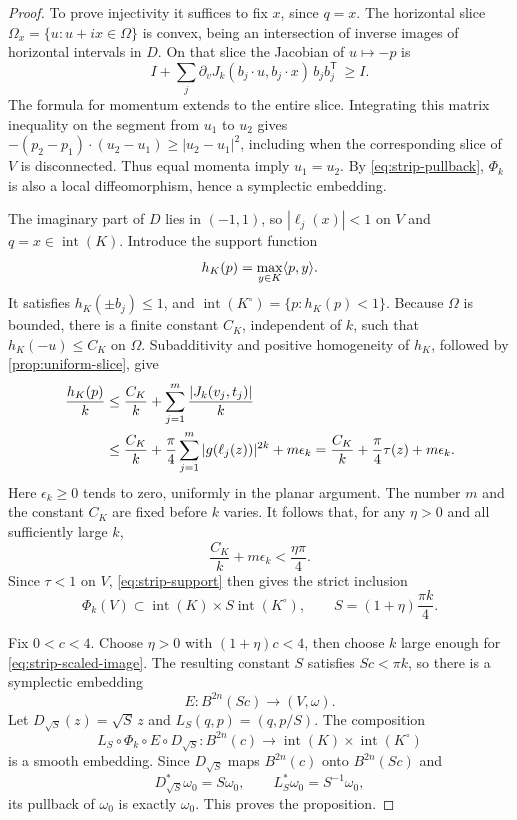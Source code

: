 \begin{proof}
To prove injectivity it suffices to fix $x$, since $q=x$. The horizontal slice $\Omega_x=\{u:u+ix\in\Omega\}$ is convex, being an intersection of inverse images of horizontal intervals in $D$. On that slice the Jacobian of $u\mapsto-p$ is
\[
 I+\sum_j\partial_vJ_k(b_j\cdot u,b_j\cdot x)\,b_j b_j^{\mathsf T}\ \ge I.
\]
The formula for momentum extends to the entire slice. Integrating this matrix inequality on the segment from $u_1$ to $u_2$ gives $-(p_2-p_1)\cdot(u_2-u_1)\ge|u_2-u_1|^2$, including when the corresponding slice of $V$ is disconnected. Thus equal momenta imply $u_1=u_2$. By \eqref{eq:strip-pullback}, $\Phi_k$ is also a local diffeomorphism, hence a symplectic embedding.

The imaginary part of $D$ lies in $(-1,1)$, so $|\ell_j(x)|<1$ on $V$ and $q=x\in\operatorname{int}(K)$. Introduce the support function
\[
 h_K(p)=\max_{y\in K}\langle p,y\rangle.
\]
It satisfies $h_K(\pm b_j)\le1$, and $\operatorname{int}(K^\circ)=\{p:h_K(p)<1\}$. Because $\Omega$ is bounded, there is a finite constant $C_K$, independent of $k$, such that $h_K(-u)\le C_K$ on $\Omega$. Subadditivity and positive homogeneity of $h_K$, followed by \cref{prop:uniform-slice}, give
\begin{align}
 \frac{h_K(p)}{k}
 &\le \frac{C_K}{k}
       +\sum_{j=1}^m\frac{|J_k(v_j,t_j)|}{k}\notag\\
 &\le \frac{C_K}{k}
       +\frac{\pi}{4}\sum_{j=1}^m|g(\ell_j(z))|^{2k}
       +m\epsilon_k
  =\frac{C_K}{k}+\frac{\pi}{4}\tau(z)+m\epsilon_k.
 \label{eq:strip-support}
\end{align}
Here $\epsilon_k\ge0$ tends to zero, uniformly in the planar argument. The number $m$ and the constant $C_K$ are fixed before $k$ varies. It follows that, for any $\eta>0$ and all sufficiently large $k$,
\[
 \frac{C_K}{k}+m\epsilon_k<\frac{\eta\pi}{4}.
\]
Since $\tau<1$ on $V$, \eqref{eq:strip-support} then gives the strict inclusion
\begin{equation}\label{eq:strip-scaled-image}
 \Phi_k(V)\subset
 \operatorname{int}(K)\times S\operatorname{int}(K^\circ),
 \qquad S=(1+\eta)\frac{\pi k}{4}.
\end{equation}

Fix $0<c<4$. Choose $\eta>0$ with $(1+\eta)c<4$, then choose $k$ large enough for \eqref{eq:strip-scaled-image}. The resulting constant $S$ satisfies $Sc<\pi k$, so there is a symplectic embedding
\[
 E:B^{2n}(Sc)\longrightarrow(V,\omega).
\]
Let $D_{\sqrt S}(z)=\sqrt S\,z$ and $L_S(q,p)=(q,p/S)$. The composition
\begin{equation}\label{eq:strip-rescaling}
 L_S\circ\Phi_k\circ E\circ D_{\sqrt S}:
 B^{2n}(c)\longrightarrow
 \operatorname{int}(K)\times\operatorname{int}(K^\circ)
\end{equation}
is a smooth embedding. Since $D_{\sqrt S}$ maps $B^{2n}(c)$ onto $B^{2n}(Sc)$ and
\[
 D_{\sqrt S}^*\omega_0=S\omega_0,
 \qquad L_S^*\omega_0=S^{-1}\omega_0,
\]
its pullback of $\omega_0$ is exactly $\omega_0$. This proves the proposition.
\end{proof}
